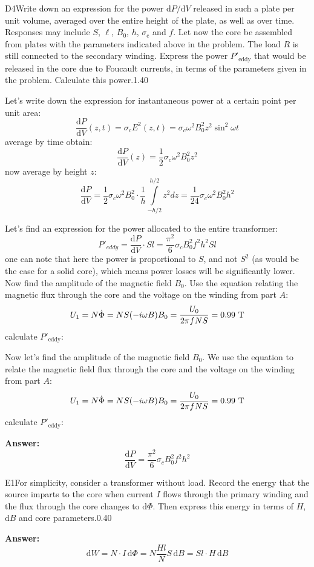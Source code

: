 \documentclass[11pt,a4paper]{article}
\begin{document}
\begin{solcard}{D4}{Write down an expression for the power $\mathrm dP/\mathrm dV$ released in such a plate per unit volume, averaged over the entire height of the plate, as well as over time. Responses may include $S$, $\ell$, $B_0$, $h$, $\sigma_{\mathrm c}$ and $f$. Let now the core be assembled from plates with the parameters indicated above in the problem. The load $R$ is still connected to the secondary winding. Express the power $P'_\mathrm{eddy}$ that would be released in the core due to Foucault currents, in terms of the parameters given in the problem. Calculate this power.}{1.40}

Let's write down the expression for instantaneous power at a certain point per unit area: $$\frac{\mathrm dP}{\mathrm dV}(z, t) = \sigma_c E^2(z, t) = \sigma_c \omega^2 B_0^2 z^2\sin^2{\omega t}$$average by time obtain: $$\frac{\mathrm dP}{\mathrm dV}(z) =\frac{1}{2} \sigma_c \omega^2 B_0^2 z^2$$now average by height $z$:$$ \frac{\mathrm dP}{\mathrm dV} =\frac{1}{2} \sigma_c \omega^2 B_0^2\cdot \frac{1}h\displaystyle\int\limits^{{h}/2}_{-{h}/2} z^2 dz = \frac{1}{24}\sigma_c \omega^2B_0^2h^2$$


Let's find an expression for the power allocated to the entire transformer: $$P'_{eddy}=\frac{\mathrm dP}{\mathrm dV}\cdot Sl = \frac{\pi^2}{6}\sigma_cB_0^2 f^2h^2Sl$$one can note that here the power is proportional to $S$, and not $S^2$ (as would be the case for a solid core), which means power losses will be significantly lower. Now find the amplitude of the magnetic field $B_0$. Use the equation relating the magnetic flux through the core and the voltage on the winding from part $A$: $$ U_1 = N\dot{\Phi} = NS(-i\omega B)\\ B_0= \frac{U_0}{2\pi fNS} = 0.99 ~\text{T} $$ calculate $P'_\mathrm{eddy}$:


Now let's find the amplitude of the magnetic field $B_0$. We use the equation to relate the magnetic field flux through the core and the voltage on the winding from part $A$: $$ U_1 = N\dot{\Phi} = NS(-i\omega B)\\ B_0= \frac{U_0}{2\pi fNS} = 0.99 ~\text{T} $$ calculate $P'_\mathrm{eddy}$:

\par\smallskip\noindent\textbf{Answer:} $$ \frac{\mathrm dP}{\mathrm dV} = \frac{\pi^2}{6}\sigma_cB_0^2 f^2h^2 $$
\end{solcard}

\begin{solcard}{E1}{For simplicity, consider a transformer without load. Record the energy that the source imparts to the core when current $I$ flows through the primary winding and the flux through the core changes to $\mathrm d\Phi$. Then express this energy in terms of $H$, $\mathrm dB$ and core parameters.}{0.40}
\par\smallskip\noindent\textbf{Answer:} $$ \mathrm dW =N\cdot I\,\mathrm d\Phi= N\frac{Hl}{N}S\,\mathrm dB=Sl\cdot H\,\mathrm dB $$
\end{solcard}
\end{document}
